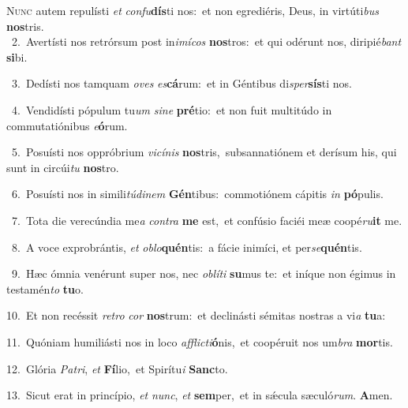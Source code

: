 \lettrine{\initial\textcolor{\initialcolor}{N}}{unc} autem repulísti \textit{et} \textit{con}\-\textit{fu}\textbf{dís}ti nos:~\star et non egrediéris, Deus, in virtúti\textit{bus} \textbf{nos}\-tris.\\
{\numbfont\textcolor{\numbcolor}{~2.}}~Avertísti nos retrórsum post in\-\textit{i}\-\textit{mí}\textit{cos} \textbf{nos}\-tros:~\star et qui odérunt nos, diripié\textit{bant} \textbf{si}\-bi.\par
{\numbfont\textcolor{\numbcolor}{~3.}}~Dedísti nos tamquam \textit{o}\-\textit{ves} \textit{es}\-\textbf{cá}rum:~\star et in Géntibus di\-\textit{sper}\-\textbf{sís}ti nos.\par
{\numbfont\textcolor{\numbcolor}{~4.}}~Vendidísti pópulum tu\textit{um} \textit{si}\-\textit{ne} \textbf{pré}\-tio:~\star et non fuit multitúdo in commutatiónibus \textit{e}\-\textbf{ó}rum.\par
{\numbfont\textcolor{\numbcolor}{~5.}}~Posuísti nos oppróbrium \textit{vi}\-\textit{cí}\textit{nis} \textbf{nos}\-tris,~\star subsannatiónem et derísum his, qui sunt in circúi\textit{tu} \textbf{nos}\-tro.\par
{\numbfont\textcolor{\numbcolor}{~6.}}~Posuísti nos in simili\-\textit{tú}\-\textit{di}\textit{nem} \textbf{Gén}\-tibus:~\star commotiónem cápitis \textit{in} \textbf{pó}\-pulis.\par
{\numbfont\textcolor{\numbcolor}{~7.}}~Tota die verecúndia me\textit{a} \textit{con}\-\textit{tra} \textbf{me} est,~\star et confúsio faciéi meæ coopé\-\textit{ru}\-\textbf{it} me.\par
{\numbfont\textcolor{\numbcolor}{~8.}}~A voce exprobrántis, \textit{et} \textit{ob}\-\textit{lo}\textbf{quén}tis:~\star a fácie inimíci, et per\-\textit{se}\-\textbf{quén}tis.\par
{\numbfont\textcolor{\numbcolor}{~9.}}~Hæc ómnia venérunt super nos, nec \textit{ob}\-\textit{lí}\textit{ti} \textbf{su}\-mus te:~\star et iníque non égimus in testamén\textit{to} \textbf{tu}\-o.\par
{\numbfont\textcolor{\numbcolor}{10.}}~Et non recéssit \textit{re}\-\textit{tro} \textit{cor} \textbf{nos}\-trum:~\star et declinásti sémitas nostras a vi\textit{a} \textbf{tu}\-a:\par
{\numbfont\textcolor{\numbcolor}{11.}}~Quóniam humiliásti nos in loco \textit{af}\-\textit{flic}\textit{ti}\textbf{ó}nis,~\star et coopéruit nos um\textit{bra} \textbf{mor}\-tis.\par
{\numbfont\textcolor{\numbcolor}{12.}}~Glória \textit{Pa}\-\textit{tri}, \textit{et} \textbf{Fí}\-lio,~\star et Spirítu\textit{i} \textbf{Sanc}\-to.\par
{\numbfont\textcolor{\numbcolor}{13.}}~Sicut erat in princípio, \textit{et} \textit{nunc}\-, \textit{et} \textbf{sem}\-per,~\star et in sǽcula sæculó\-\textit{rum}\-. \textbf{A}\-men.\par
